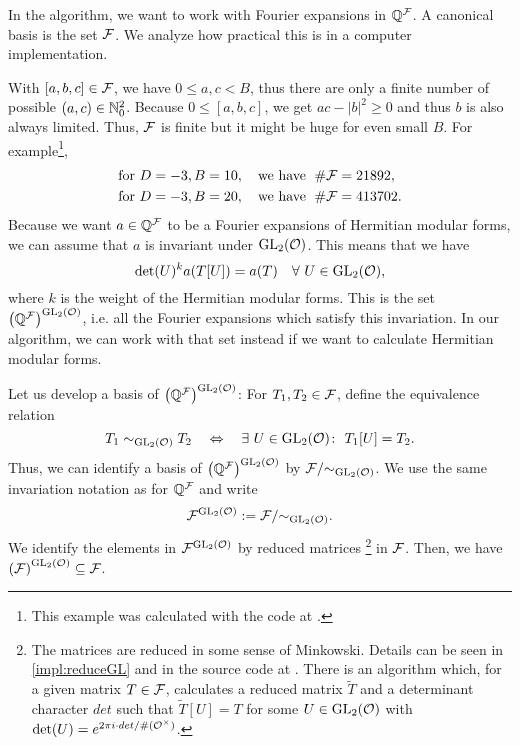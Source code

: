 \begin{remark}
\label{remark:reducedCurlF}
\label{reducedCurlF}
In the algorithm, we want to work with Fourier expansions in $\mathbb{Q}^{\mathcal{F}}$. A canonical basis is the set $\mathcal{F}$. We analyze how practical this is in a computer implementation.

With $[a,b,c] \in \mathcal{F}$, we have $0\le a,c<B$, thus there are only a finite number of possible $(a,c) \in \mathbb{N}_0^2$. Because $0 \le [a,b,c]$, we get $ac - \left| b \right|^2 \ge 0$ and thus $b$ is also always limited. Thus, $\mathcal{F}$ is finite but it might be huge for even small $B$.
For example\footnote{ This example was calculated with the code at \cite{Zeyer13Github}.},
\begin{align*}
& \text{for } D=-3, B=10,\quad \text{we have } \; \# \mathcal{F} = 21892, \\
& \text{for } D=-3, B=20,\quad \text{we have } \; \# \mathcal{F} = 413702.
\end{align*}
%
Because we want $a \in \mathbb{Q}^{\mathcal{F}}$ to be a Fourier expansions of Hermitian modular forms, we can assume that $a$ is invariant under $\operatorname{GL}_2(\mathcal{O})$. This means that we have
\[ \det(U)^k a(T[U]) = a(T) \quad \forall\ U \in \operatorname{GL}_2(\mathcal{O}) , \]
where $k$ is the weight of the Hermitian modular forms.
This is the set ${\left(\mathbb{Q}^{\mathcal{F}}\right)}^{\operatorname{GL}_2(\mathcal{O})}$, i.e. all the Fourier expansions which satisfy this invariation. In our algorithm, we can work with that set instead if we want to calculate Hermitian modular forms.

Let us develop a basis of ${\left(\mathbb{Q}^{\mathcal{F}}\right)}^{\operatorname{GL}_2(\mathcal{O})}$: For $T_1, T_2 \in \mathcal{F}$, define the equivalence relation
\[ T_1 \sim_{\operatorname{GL}_2(\mathcal{O})} T_2 \quad \Leftrightarrow \quad \exists\ U \in \operatorname{GL}_2(\mathcal{O}) \colon\ T_1[U] = T_2. \]
Thus, we can identify a basis of ${\left(\mathbb{Q}^{\mathcal{F}}\right)}^{\operatorname{GL}_2(\mathcal{O})}$ by $\mathcal{F} / { \sim_{\operatorname{GL}_2(\mathcal{O})} }$.
We use the same invariation notation as for $\mathbb{Q}^{\mathcal{F}}$ and write
\[ {\mathcal{F}}^{\operatorname{GL}_2(\mathcal{O})} := \mathcal{F} / { \sim_{\operatorname{GL}_2(\mathcal{O})} } . \]
We identify the elements in ${\mathcal{F}}^{\operatorname{GL}_2(\mathcal{O})}$ by reduced matrices%
\footnote{
The matrices are reduced in some sense of Minkowski. Details can be seen in \cref{impl:reduceGL} and in the source code at \cite{Zeyer13Github}. There is an algorithm which, for a given matrix $T \in \mathcal{F}$, calculates a reduced matrix $\tilde{T}$ and a determinant character $det$ such that $\tilde{T}[U] = T$ for some $U \in \operatorname{GL}_2(\mathcal{O})$ with $\det(U) = e^{2 \pi i \cdot det / {\#(\mathcal{O}^\times)}}$.
}
in $\mathcal{F}$. Then, we have ${\left(\mathcal{F}\right)}^{\operatorname{GL}_2(\mathcal{O})} \subseteq \mathcal{F}$.


\end{remark}
